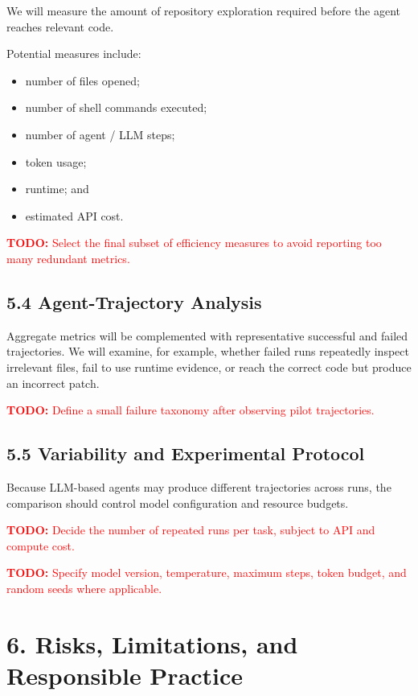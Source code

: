 \documentclass[11pt]{article}
\newcommand{\todo}[1]{%
    \textcolor{red}{\textbf{TODO:} #1}%
}
\begin{document}
We will measure the amount of repository exploration required before the
agent reaches relevant code.

Potential measures include:

\begin{itemize}[leftmargin=*, itemsep=0.25em]
    \item number of files opened;
    \item number of shell commands executed;
    \item number of agent / LLM steps;
    \item token usage;
    \item runtime; and
    \item estimated API cost.
\end{itemize}

\todo{Select the final subset of efficiency measures to avoid reporting
too many redundant metrics.}


\subsection*{5.4 Agent-Trajectory Analysis}

Aggregate metrics will be complemented with representative successful
and failed trajectories. We will examine, for example, whether failed
runs repeatedly inspect irrelevant files, fail to use runtime evidence,
or reach the correct code but produce an incorrect patch.

\todo{Define a small failure taxonomy after observing pilot trajectories.}


\subsection*{5.5 Variability and Experimental Protocol}

Because LLM-based agents may produce different trajectories across runs,
the comparison should control model configuration and resource budgets.

\todo{Decide the number of repeated runs per task, subject to API and
compute cost.}

\todo{Specify model version, temperature, maximum steps, token budget,
and random seeds where applicable.}


\section*{6. Risks, Limitations, and Responsible Practice}
\end{document}
